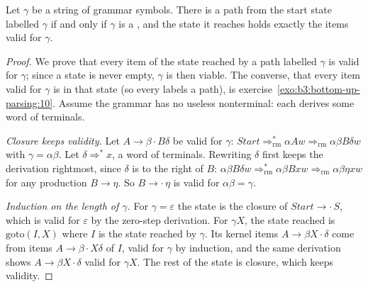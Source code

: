 \begin{omfigure}
\par{}
\end{omfigure}

\begin{theorem}\label{thm:b3:bottom-up-parsing:viable}
Let $\gamma$ be a string of grammar symbols. There is a path from the start state labelled $\gamma$ if and only if $\gamma$ is a , and the state it reaches holds exactly the items valid for $\gamma$.
\end{theorem}

\begin{proof}
We prove that every item of the state reached by a path labelled $\gamma$ is valid for $\gamma$; since a state is never empty, $\gamma$ is then viable. The converse, that every item valid for $\gamma$ is in that state (so every  labels a path), is exercise~\ref{exo:b3:bottom-up-parsing:10}. Assume the grammar has no useless nonterminal: each derives some word of terminals.

\emph{Closure keeps validity.} Let $A \to \beta \cdot B\delta$ be valid for $\gamma$: $\mathit{Start} \Rightarrow^*_{\mathrm{rm}} \alpha A w \Rightarrow_{\mathrm{rm}} \alpha\beta B\delta w$ with $\gamma = \alpha\beta$. Let $\delta \Rightarrow^* x$, a word of terminals. Rewriting $\delta$ first keeps the derivation rightmost, since $\delta$ is to the right of $B$: $\alpha\beta B\delta w \Rightarrow^*_{\mathrm{rm}} \alpha\beta B x w \Rightarrow_{\mathrm{rm}} \alpha\beta\eta x w$ for any production $B \to \eta$. So $B \to \cdot\,\eta$ is valid for $\alpha\beta = \gamma$.

\emph{Induction on the length of $\gamma$.} For $\gamma = \varepsilon$ the state is the closure of $\mathit{Start} \to \cdot\,S$, which is valid for $\varepsilon$ by the zero-step derivation. For $\gamma X$, the state reached is $\mathrm{goto}(I, X)$ where $I$ is the state reached by $\gamma$. Its kernel items $A \to \beta X \cdot \delta$ come from items $A \to \beta \cdot X\delta$ of $I$, valid for $\gamma$ by induction, and the same derivation shows $A \to \beta X \cdot \delta$ valid for $\gamma X$. The rest of the state is closure, which keeps validity.
\end{proof}

